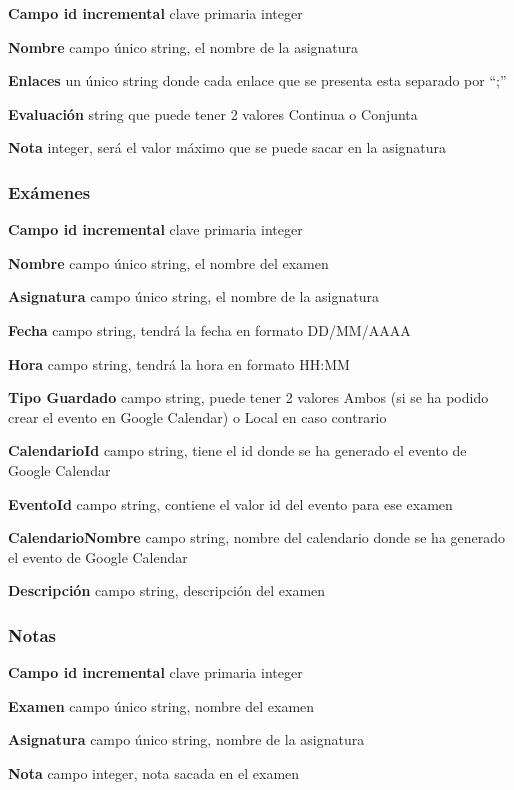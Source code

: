 \textbf{Campo id incremental} clave primaria integer

\textbf{Nombre} campo único string, el nombre de la asignatura

\textbf{Enlaces}   un único string donde cada enlace que se presenta esta separado por “;”

\textbf{Evaluación} string que puede tener 2 valores Continua o Conjunta

\textbf{Nota} integer, será el valor máximo que se puede sacar en la asignatura

\subsubsection{Exámenes}
\label{subsubsecc:Exámenes}


\textbf{Campo id incremental} clave primaria integer

\textbf{Nombre} campo único string, el nombre del examen

\textbf{Asignatura} campo único string, el nombre de la asignatura

\textbf{Fecha} campo string, tendrá la fecha en formato DD/MM/AAAA

\textbf{Hora} campo string, tendrá la hora en formato HH:MM

\textbf{Tipo Guardado} campo string, puede tener 2 valores Ambos (si se ha podido crear el evento en Google Calendar) o Local  en caso contrario

\textbf{CalendarioId} campo string, tiene el id donde se ha generado el evento de Google Calendar

\textbf{EventoId} campo string, contiene el valor id del evento para ese examen

\textbf{CalendarioNombre} campo string, nombre del calendario donde se ha generado el evento de Google Calendar

\textbf{Descripción} campo string, descripción del examen

\subsubsection{Notas}
\label{subsubsecc:Notas}


\textbf{Campo id incremental} clave primaria integer

\textbf{Examen} campo único string, nombre del examen

\textbf{Asignatura} campo único string, nombre de la asignatura

\textbf{Nota} campo integer, nota sacada en el examen

